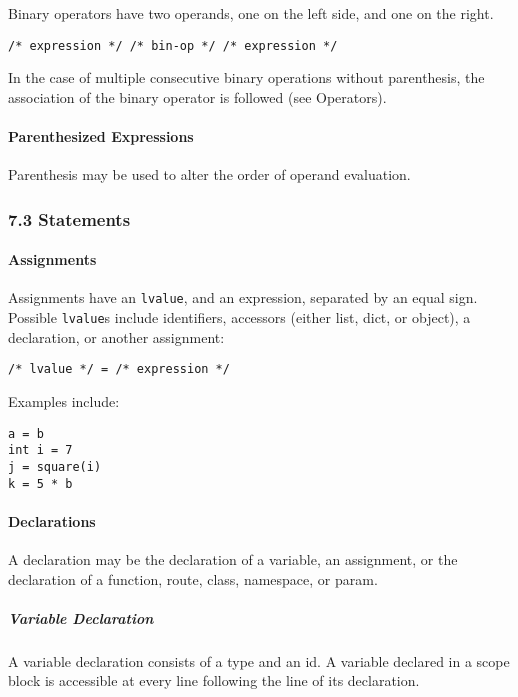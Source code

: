 \documentclass[]{article}
\begin{document}
Binary operators have two operands, one on the left side, and one on the
right.

\begin{verbatim}
/* expression */ /* bin-op */ /* expression */
\end{verbatim}

In the case of multiple consecutive binary operations without
parenthesis, the association of the binary operator is followed (see
Operators).

\paragraph{Parenthesized Expressions}\label{parenthesized-expressions}

Parenthesis may be used to alter the order of operand evaluation.

\subsubsection{7.3 Statements}\label{statements}

\paragraph{Assignments}\label{assignments}

Assignments have an \texttt{lvalue}, and an expression, separated by an
equal sign. Possible \texttt{lvalue}s include identifiers, accessors
(either list, dict, or object), a declaration, or another assignment:

\begin{verbatim}
/* lvalue */ = /* expression */
\end{verbatim}

Examples include:

\begin{verbatim}
a = b
int i = 7
j = square(i)
k = 5 * b
\end{verbatim}

\paragraph{Declarations}\label{declarations}

A declaration may be the declaration of a variable, an assignment, or
the declaration of a function, route, class, namespace, or param.

\subparagraph{Variable Declaration}\label{variable-declaration}

A variable declaration consists of a type and an id. A variable declared
in a scope block is accessible at every line following the line of its
declaration.
\end{document}
